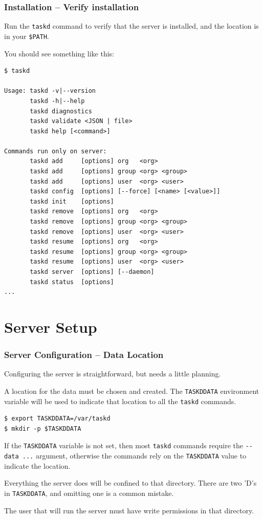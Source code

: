 \documentclass[t,handout]{beamer}
\begin{document}
\begin{frame}[fragile]\frametitle{Installation -- Verify installation}
    Run the \verb+taskd+ command to verify that the server is installed, and the location is in your \verb+$PATH+.

    You should see something like this:

    \begin{lstlisting}
$ taskd

Usage: taskd -v|--version
       taskd -h|--help
       taskd diagnostics
       taskd validate <JSON | file>
       taskd help [<command>]

Commands run only on server:
       taskd add     [options] org   <org>
       taskd add     [options] group <org> <group>
       taskd add     [options] user  <org> <user>
       taskd config  [options] [--force] [<name> [<value>]]
       taskd init    [options]
       taskd remove  [options] org   <org>
       taskd remove  [options] group <org> <group>
       taskd remove  [options] user  <org> <user>
       taskd resume  [options] org   <org>
       taskd resume  [options] group <org> <group>
       taskd resume  [options] user  <org> <user>
       taskd server  [options] [--daemon]
       taskd status  [options]
...\end{lstlisting}
\end{frame}

\section{Server Setup}

\begin{frame}[fragile]\frametitle{Server Configuration -- Data Location}
    Configuring the server is straightforward, but needs a little planning.

    A location for the data must be chosen and created. The \verb+TASKDDATA+ environment variable will be used to indicate that location to all the \verb+taskd+ commands.

    \begin{lstlisting}
$ export TASKDDATA=/var/taskd
$ mkdir -p $TASKDDATA\end{lstlisting}

    If the \verb+TASKDDATA+ variable is not set, then most \verb+taskd+ commands require the \verb+--data ...+ argument, otherwise the commands rely on the \verb+TASKDDATA+ value to indicate the location.

        \begin{alertblock}{Everything the server does will be confined to that directory.}
        There are two 'D's in \verb+TASKDDATA+, and omitting one is a common mistake.

        The user that will run the server must have write permissions in that directory.
	\end{alertblock}
\end{frame}
\end{document}
